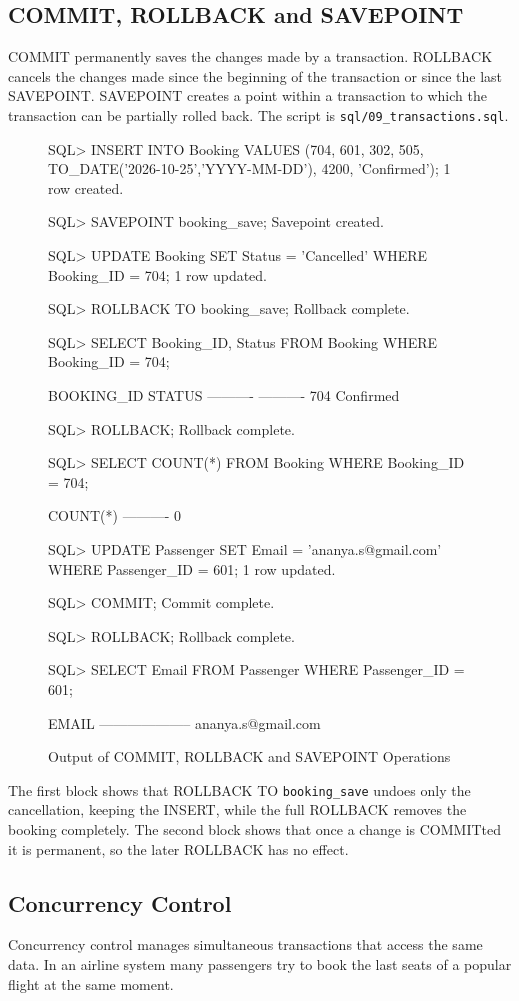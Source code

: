 \documentclass[12pt,a4paper]{article}
\begin{document}
\subsection{COMMIT, ROLLBACK and SAVEPOINT}
COMMIT permanently saves the changes made by a transaction. ROLLBACK cancels the changes made since the
beginning of the transaction or since the last SAVEPOINT. SAVEPOINT creates a point within a transaction
to which the transaction can be partially rolled back. The script is \texttt{sql/09\_transactions.sql}.
\begin{figure}[H]
\begin{terminal}
SQL> INSERT INTO Booking VALUES (704, 601, 302, 505, TO_DATE('2026-10-25','YYYY-MM-DD'), 4200, 'Confirmed');
1 row created.

SQL> SAVEPOINT booking_save;
Savepoint created.

SQL> UPDATE Booking SET Status = 'Cancelled' WHERE Booking_ID = 704;
1 row updated.

SQL> ROLLBACK TO booking_save;
Rollback complete.

SQL> SELECT Booking_ID, Status FROM Booking WHERE Booking_ID = 704;

BOOKING_ID STATUS
---------- ----------
       704 Confirmed

SQL> ROLLBACK;
Rollback complete.

SQL> SELECT COUNT(*) FROM Booking WHERE Booking_ID = 704;

  COUNT(*)
----------
         0

SQL> UPDATE Passenger SET Email = 'ananya.s@gmail.com' WHERE Passenger_ID = 601;
1 row updated.

SQL> COMMIT;
Commit complete.

SQL> ROLLBACK;
Rollback complete.

SQL> SELECT Email FROM Passenger WHERE Passenger_ID = 601;

EMAIL
--------------------
ananya.s@gmail.com
\end{terminal}
\caption{Output of COMMIT, ROLLBACK and SAVEPOINT Operations}
\end{figure}
The first block shows that ROLLBACK TO \texttt{booking\_save} undoes only the cancellation, keeping the
INSERT, while the full ROLLBACK removes the booking completely. The second block shows that once a change is
COMMITted it is permanent, so the later ROLLBACK has no effect.

\subsection{Concurrency Control}
Concurrency control manages simultaneous transactions that access the same data. In an airline system many
passengers try to book the last seats of a popular flight at the same moment.
\end{document}
